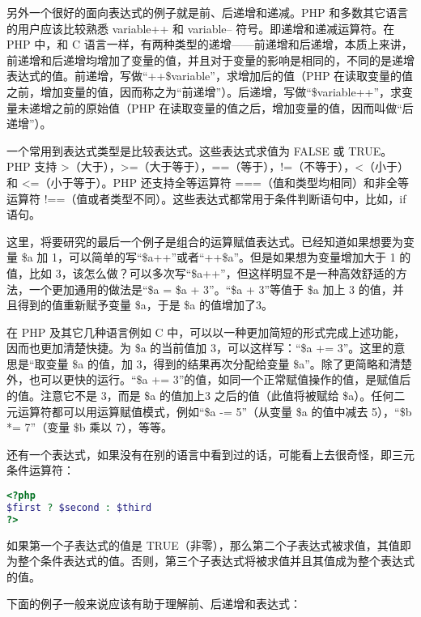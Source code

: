 另外一个很好的面向表达式的例子就是前、后递增和递减。PHP 和多数其它语言的用户应该比较熟悉 variable++ 和 variable-- 符号。即递增和递减运算符。在 PHP 中，和 C 语言一样，有两种类型的递增——前递增和后递增，本质上来讲，前递增和后递增均增加了变量的值，并且对于变量的影响是相同的，不同的是递增表达式的值。前递增，写做“++\$variable”，求增加后的值（PHP 在读取变量的值之前，增加变量的值，因而称之为“前递增”）。后递增，写做“\$variable++”，求变量未递增之前的原始值（PHP 在读取变量的值之后，增加变量的值，因而叫做“后递增”）。

一个常用到表达式类型是比较表达式。这些表达式求值为 FALSE 或 TRUE。PHP 支持 >（大于），>\/=（大于等于），=\/=（等于），!\/=（不等于），<（小于）和 <\/=（小于等于）。PHP 还支持全等运算符 =\/=\/=（值和类型均相同）和非全等运算符 !\/=\/=（值或者类型不同）。这些表达式都常用于条件判断语句中，比如，if 语句。

这里，将要研究的最后一个例子是组合的运算赋值表达式。已经知道如果想要为变量 \$a 加 1，可以简单的写“\$a++”或者“++\$a”。但是如果想为变量增加大于 1 的值，比如 3，该怎么做？可以多次写“\$a++”，但这样明显不是一种高效舒适的方法，一个更加通用的做法是“\$a = \$a + 3”。“\$a + 3”等值于 \$a 加上 3 的值，并且得到的值重新赋予变量 \$a，于是 \$a 的值增加了3。

在 PHP 及其它几种语言例如 C 中，可以以一种更加简短的形式完成上述功能，因而也更加清楚快捷。为 \$a 的当前值加 3，可以这样写：“\$a += 3”。这里的意思是“取变量 \$a 的值，加 3，得到的结果再次分配给变量 \$a”。除了更简略和清楚外，也可以更快的运行。“\$a += 3”的值，如同一个正常赋值操作的值，是赋值后的值。注意它不是 3，而是 \$a 的值加上3 之后的值（此值将被赋给 \$a）。任何二元运算符都可以用运算赋值模式，例如“\$a -= 5”（从变量 \$a 的值中减去 5），“\$b *= 7”（变量 \$b 乘以 7），等等。

还有一个表达式，如果没有在别的语言中看到过的话，可能看上去很奇怪，即三元条件运算符：


\begin{lstlisting}[language=PHP]
<?php
$first ? $second : $third
?>
\end{lstlisting}

如果第一个子表达式的值是 TRUE（非零），那么第二个子表达式被求值，其值即为整个条件表达式的值。否则，第三个子表达式将被求值并且其值成为整个表达式的值。

下面的例子一般来说应该有助于理解前、后递增和表达式：


